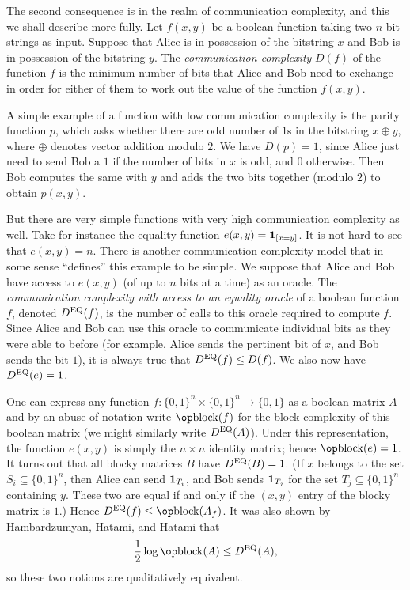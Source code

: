 The second consequence is in the realm of communication complexity, and this we shall describe
more fully. Let $f(x,y)$ be a boolean function taking two $n$-bit strings as input.
Suppose that Alice is in possession of the bitstring $x$ and Bob is in possession of the bitstring $y$.
The {\it communication complexity} $D(f)$ of the function $f$ is the minimum number of bits
that Alice and Bob need to exchange in order for either of them to work out the value
of the function $f(x,y)$.

A simple example of a function with low communication complexity
is the parity function $p$, which asks whether there are odd number of $1$s
in the bitstring $x \oplus y$, where $\oplus$ denotes vector addition modulo $2$. We have
$D(p) = 1$, since Alice just need to send Bob a $1$ if the number of bits in $x$ is odd, and $0$ otherwise.
Then Bob computes the same with $y$ and adds the two bits together (modulo $2$) to obtain $p(x,y)$.

But there are very simple functions with very high communication complexity as well. Take for instance
the equality function $e(x,y) = {\bf 1}_{[x=y]}$. It is not hard to see that $e(x,y) = n$.
There is another communication complexity model that in some sense ``defines'' this example to be
simple. We suppose that Alice and Bob have access to $e(x,y)$ (of up to $n$ bits at a time)
as an oracle.
The {\it communication complexity with access to an equality oracle} of a boolean function
$f$, denoted $D^{\rm EQ}(f)$, is the number of calls to this oracle required to compute $f$.
Since Alice and Bob can use this oracle to communicate individual bits
as they were able to before (for example,
Alice sends the pertinent bit of $x$, and Bob sends the bit $1$), it is always true
that $D^{\rm EQ}(f) \le D(f)$.
We also now have $D^{\rm EQ}(e) = 1$.

One can express any function $f:\{0,1\}^n\times \{0,1\}^n \to \{0,1\}$ as a boolean matrix $A$
and by an abuse of notation write $\block(f)$ for the block complexity of this boolean matrix
(we might similarly write $D^{\rm EQ}(A)$).
Under this representation, the function $e(x,y)$ is simply the $n\times n$ identity matrix;
hence $\block(e) = 1$.
It turns out that all blocky matrices $B$ have $D^{\rm EQ}(B) = 1$.
(If $x$ belongs to the set $S_i\subseteq \{0,1\}^n$,
then Alice can send ${\bf 1}_{T_i}$, and Bob sends ${\bf 1}_{T_j}$ for the set $T_j\subseteq\{0,1\}^n$
containing $y$. These two are equal if and only if the $(x,y)$ entry of the blocky matrix is $1$.)
Hence $\DEQ(f)\le \block(A_f)$. It was also shown by Hambardzumyan, Hatami, and Hatami that
$${1\over 2} \log \block(A) \le \DEQ(A),$$
so these two notions are qualitatively equivalent.

